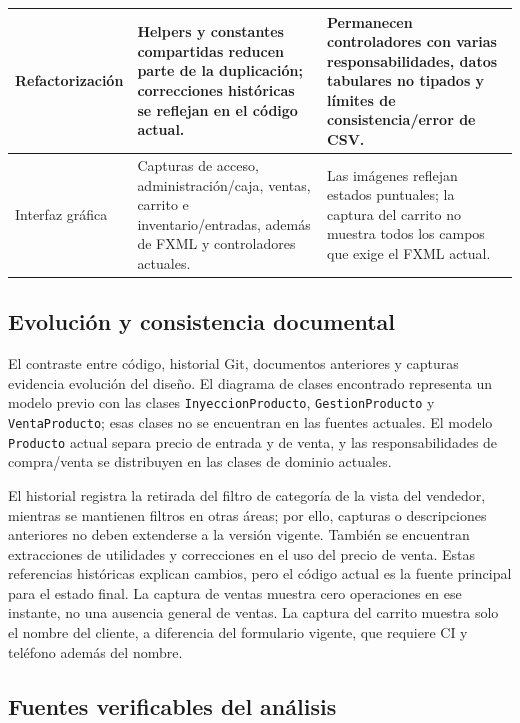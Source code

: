 \begin{longtable}{|p{3.1cm}|p{5.3cm}|p{4.8cm}|}
\hline
Refactorización & Helpers y constantes compartidas reducen parte de la duplicación; correcciones históricas se reflejan en el código actual. & Permanecen controladores con varias responsabilidades, datos tabulares no tipados y límites de consistencia/error de CSV.\\
\hline
Interfaz gráfica & Capturas de acceso, administración/caja, ventas, carrito e inventario/entradas, además de FXML y controladores actuales. & Las imágenes reflejan estados puntuales; la captura del carrito no muestra todos los campos que exige el FXML actual.\\
\hline
\end{longtable}

\subsection*{Evolución y consistencia documental}

El contraste entre código, historial Git, documentos anteriores y capturas evidencia evolución del diseño. El diagrama de clases encontrado representa un modelo previo con las clases \texttt{InyeccionProducto}, \texttt{GestionProducto} y \texttt{VentaProducto}; esas clases no se encuentran en las fuentes actuales. El modelo \texttt{Producto} actual separa precio de entrada y de venta, y las responsabilidades de compra/venta se distribuyen en las clases de dominio actuales.

El historial registra la retirada del filtro de categoría de la vista del vendedor, mientras se mantienen filtros en otras áreas; por ello, capturas o descripciones anteriores no deben extenderse a la versión vigente. También se encuentran extracciones de utilidades y correcciones en el uso del precio de venta. Estas referencias históricas explican cambios, pero el código actual es la fuente principal para el estado final. La captura de ventas muestra cero operaciones en ese instante, no una ausencia general de ventas. La captura del carrito muestra solo el nombre del cliente, a diferencia del formulario vigente, que requiere CI y teléfono además del nombre.

\subsection*{Fuentes verificables del análisis}

